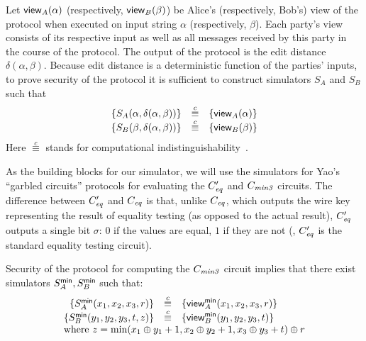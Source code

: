 Let $\mathsf{view}_A(\alpha)$ (respectively, $\mathsf{view}_B(\beta)$) be Alice's
(respectively, Bob's) view of the protocol when executed on input string
$\alpha$ (respectively, $\beta$).  Each party's view consists of its
respective input as well as all messages received by this party in the
course of the protocol.  The output of the protocol is the edit distance
$\delta(\alpha,\beta)$.  Because edit distance is a deterministic function
of the parties' inputs, to prove security of the protocol it is sufficient
to construct simulators $S_A$ and $S_B$ such that
\[
\begin{array}{rcl}
\{S_A(\alpha,\delta(\alpha,\beta))\} 
& \stackrel{c}{\equiv} &
\{\mathsf{view}_A(\alpha)\} \\
\{S_B(\beta,\delta(\alpha,\beta))\} 
& \stackrel{c}{\equiv} &
\{\mathsf{view}_B(\beta)\}
\end{array}
\]
Here $\stackrel{c}{\equiv}$ stands for computational
indistinguishability~\cite{GoldreichBookVol1}.

As the building blocks for our simulator, we will use the simulators for
Yao's ``garbled circuits'' protocols for evaluating the $C_{\mathit{eq}}'$ and $C_{\mathit{min3}}$
circuits.  The difference between $C_{\mathit{eq}}'$ and $C_{\mathit{eq}}$ is that, unlike $C_{\mathit{eq}}$,
which outputs the wire key representing the result of equality testing
(as opposed to the actual result), $C_{\mathit{eq}}'$ outputs a single bit $\sigma$:
$0$ if the values are equal, $1$ if they are not (\ie, $C_{\mathit{eq}}'$ is the
standard equality testing circuit).


Security of the protocol for computing the $C_{\mathit{min3}}$ circuit implies that
there exist simulators $S^\mathsf{min}_A,S^\mathsf{min}_B$ such that:
\[
\begin{array}{rcl}
\{\mot_A(x_1,x_2,x_3,r)\} 
& \stackrel{c}{\equiv} &
\{\view^{\mathsf{min}}_A(x_1,x_2,x_3,r)\} \\
\{\mot_B(y_1,y_2,y_3,t,z)\} 
& \stackrel{c}{\equiv} &
\{\view^{\mathsf{min}}_B(y_1,y_2,y_3,t)\} \\
\multicolumn{3}{l}{
\mbox{where } z=\min(x_1 \oplus y_1 + 1,x_2 \oplus y_2 + 1,x_3 \oplus y_3+t) \oplus r
}
\end{array}
\]

